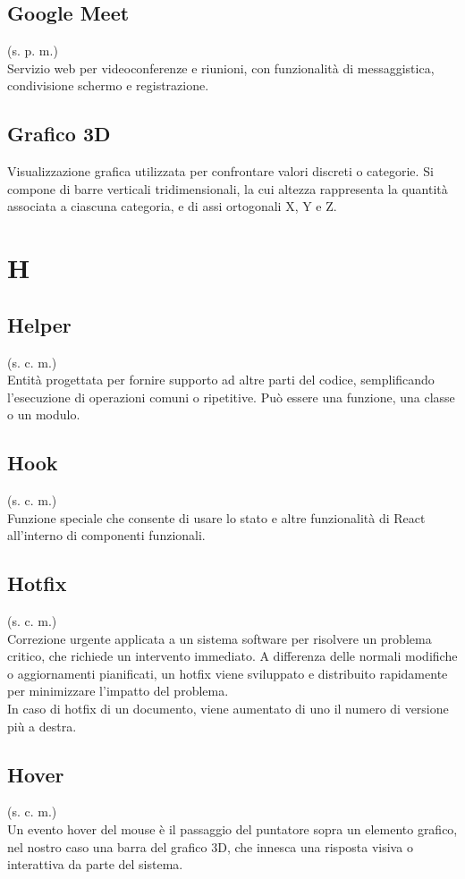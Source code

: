 \subsection{Google Meet}
(s. p. m.)\\
Servizio web per videoconferenze e riunioni, con funzionalità di messaggistica,
condivisione schermo e registrazione.
\subsection{Grafico 3D}
Visualizzazione grafica utilizzata per confrontare valori discreti o categorie.
Si compone di barre verticali tridimensionali, la cui altezza rappresenta la
quantità associata a ciascuna categoria, e di assi ortogonali X, Y e Z.
\pagebreak
\section{H}
\subsection{Helper}
(s. c. m.)\\
Entità progettata per fornire supporto ad altre parti del codice,
semplificando l'esecuzione di operazioni comuni o ripetitive.
Può essere una funzione, una classe o un modulo.
\subsection{Hook}
(s. c. m.)\\
Funzione speciale che consente di usare lo stato e altre funzionalità di React all'interno di componenti funzionali.
\subsection{Hotfix}
(s. c. m.)\\
Correzione urgente applicata a un sistema software per risolvere un problema critico,
che richiede un intervento immediato. A differenza delle normali modifiche o aggiornamenti pianificati,
un hotfix viene sviluppato e distribuito rapidamente per minimizzare l'impatto del problema.\\
In caso di hotfix di un documento, viene aumentato di uno il numero di versione più a destra.
\subsection{Hover}
(s. c. m.)\\
Un evento hover del mouse è il passaggio del puntatore sopra un elemento grafico, nel nostro caso una barra del grafico 3D, che innesca una risposta visiva o interattiva da parte del sistema.
\pagebreak
